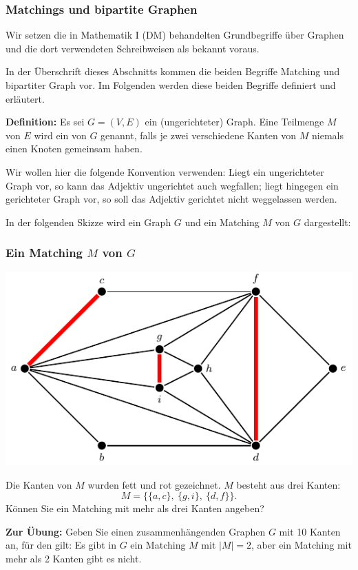 \documentclass[smaller]{beamer}
\begin{document}
\begin{frame}
 \frametitle{Matchings und bipartite Graphen}
 Wir setzen die in {\glqq}Mathematik I (DM){\grqq} behandelten Grundbegriffe über Graphen und die dort verwendeten Schreibweisen als bekannt voraus. \\ \vspace*{0.2cm}

In der Überschrift dieses Abschnitts kommen die beiden Begriffe {\glqq}Matching{\grqq} und {\glqq}bipartiter Graph{\grqq} vor. Im Folgenden werden diese beiden Begriffe definiert und erläutert. \\ \vspace*{0.2cm}

\textbf{Definition:} Es sei $G=(V,E)$ ein (ungerichteter) Graph. Eine Teilmenge $M$ von $E$ wird ein  von $G$ genannt, falls je zwei verschiedene Kanten von $M$ niemals einen Knoten gemeinsam haben. \\ \vspace*{0.2cm}

Wir wollen hier die folgende \alert{Konvention} verwenden: Liegt ein ungerichteter Graph vor, so kann das Adjektiv {\glqq}ungerichtet{\grqq} auch wegfallen; liegt hingegen ein gerichteter Graph vor, so soll das Adjektiv {\glqq}gerichtet{\grqq} nicht weggelassen werden. \\ \vspace*{0.2cm}

In der folgenden Skizze wird ein Graph $G$ und ein Matching $M$ von $G$ dargestellt: 
\end{frame}

\begin{frame}
 \frametitle{Ein Matching $M$ von $G$}
 \begin{center}
  \includegraphics[scale=0.8]{fig34.pdf}
 \end{center}
Die Kanten von $M$ wurden fett und rot gezeichnet. $M$ besteht aus drei Kanten:
\[
M = \big\{ \{ a,c \},\ \{ g,i \},\ \{ d,f \} \big\}.
\]
Können Sie ein Matching mit mehr als drei Kanten angeben? \\ \vspace*{0.2cm}

\textbf{Zur Übung:} Geben Sie einen zusammenhängenden Graphen $G$ mit 10 Kanten an, für den gilt: Es gibt in $G$ ein Matching $M$ mit $|M| = 2$, aber ein Matching mit mehr als 2 Kanten gibt es nicht.
\end{frame}
\end{document}

